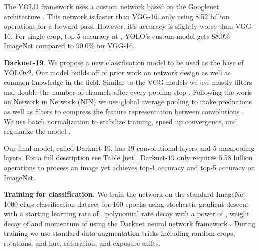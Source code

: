 \documentclass[10pt,twocolumn,letterpaper]{article}
\begin{document}
The YOLO framework uses a custom network based on the Googlenet architecture \cite{googlenet}. This network is faster than VGG-16, only using 8.52 billion operations for a forward pass. However, it's accuracy is slightly worse than VGG-16. For single-crop, top-5 accuracy at , YOLO's custom model gets 88.0\% ImageNet compared to 90.0\% for VGG-16.

\textbf{Darknet-19}. We propose a new classification model to be used as the base of YOLOv2. Our model builds off of prior work on network design as well as common knowledge in the field. Similar to the VGG models we use mostly  filters and double the number of channels after every pooling step \cite{vgg}. Following the work on Network in Network (NIN) we use global average pooling to make predictions as well as  filters to compress the feature representation between  convolutions \cite{lin2013network}. We use batch normalization to stabilize training, speed up convergence, and regularize the model \cite{batch}.

Our final model, called Darknet-19, has 19 convolutional layers and 5 maxpooling layers. For a full description see Table \ref{net}. Darknet-19 only requires 5.58 billion operations to process an image yet achieves  top-1 accuracy and  top-5 accuracy on ImageNet. 

\textbf{Training for classification.} We train the network on the standard ImageNet 1000 class classification dataset for 160 epochs using stochastic gradient descent with a starting learning rate of , polynomial rate decay with a power of , weight decay of  and momentum of  using the Darknet neural network framework \cite{darknet13}. During training we use standard data augmentation tricks including random crops, rotations, and hue, saturation, and exposure shifts.
\end{document}
